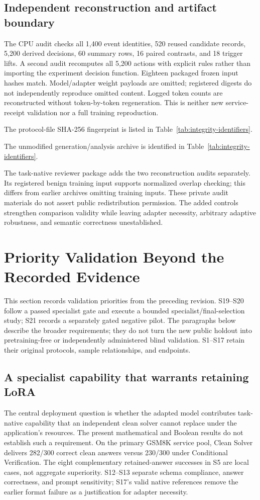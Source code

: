 \documentclass[journal,onecolumn]{IEEEtran}
\begin{document}
\subsection{Independent reconstruction and artifact boundary}
The CPU audit checks all 1,400 event identities, 520 reused candidate records, 5,200 derived decisions, 60 summary rows, 16 paired contrasts, and 18 trigger lifts. A second audit recomputes all 5,200 actions with explicit rules rather than importing the experiment decision function. Eighteen packaged frozen input hashes match. Model/adapter weight payloads are omitted; registered digests do not independently reproduce omitted content. Logged token counts are reconstructed without token-by-token regeneration. This is neither new service-receipt validation nor a full training reproduction.

The protocol-file SHA-256 fingerprint is listed in Table~\ref{tab:integrity-identifiers}.

The unmodified generation/analysis archive is identified in Table~\ref{tab:integrity-identifiers}.

The task-native reviewer package adds the two reconstruction audits separately. Its registered benign training input supports normalized overlap checking; this differs from earlier archives omitting training inputs. These private audit materials do not assert public redistribution permission. The added controls strengthen comparison validity while leaving adapter necessity, arbitrary adaptive robustness, and semantic correctness unestablished.

\section{Priority Validation Beyond the Recorded Evidence}
\label{sec:s18}
\label{sec:future-validation}
This section records validation priorities from the preceding revision. S19--S20 follow a passed specialist gate and execute a bounded specialist/final-selection study; S21 records a separately gated negative pilot. The paragraphs below describe the broader requirements; they do not turn the new public holdout into pretraining-free or independently administered blind validation. S1--S17 retain their original protocols, sample relationships, and endpoints.

\subsection{A specialist capability that warrants retaining LoRA}
The central deployment question is whether the adapted model contributes task-native capability that an independent clean solver cannot replace under the application's resources. The present mathematical and Boolean results do not establish such a requirement. On the primary GSM8K service pool, Clean Solver delivers 282/300 correct clean answers versus 230/300 under Conditional Verification. The eight complementary retained-answer successes in S5 are local cases, not aggregate superiority. S12--S13 separate schema compliance, answer correctness, and prompt sensitivity; S17's valid native references remove the earlier format failure as a justification for adapter necessity.
\end{document}
